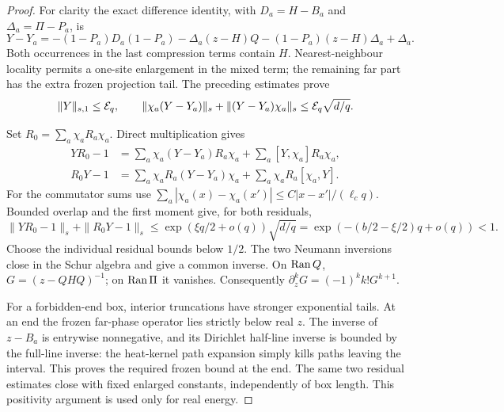 \begin{proof}
For clarity the exact difference identity, with
$D_a=H-B_a$ and $\Delta_a=\Pi-P_a$, is
\begin{equation}\label{eq:belowmismatch}
 Y-Y_a=-(1-P_a)D_a(1-P_a)
 -\Delta_a(z-H)Q-(1-P_a)(z-H)\Delta_a+\Delta_a.
\end{equation}
Both occurrences in the last compression terms contain $H$.
Nearest-neighbour locality permits a one-site enlargement in the mixed term; the remaining far part has the extra frozen projection tail. The preceding estimates prove
\[
 \|Y\|_{s,1}\le\mathcal E_q,\qquad
 \|\chi_a(Y-Y_a)\|_s+\|(Y-Y_a)\chi_a\|_s\le\mathcal E_q\sqrt{d/q}.
\]

Set $R_0=\sum_a\chi_aR_a\chi_a$. Direct multiplication gives
\[
\begin{split}
 YR_0-1&=\sum_a\chi_a(Y-Y_a)R_a\chi_a
                  +\sum_a[Y,\chi_a]R_a\chi_a,\\
 R_0Y-1&=\sum_a\chi_aR_a(Y-Y_a)\chi_a
                  +\sum_a\chi_aR_a[\chi_a,Y].
\end{split}
\]
For the commutator sums use
$\sum_a|\chi_a(x)-\chi_a(x')|\le C|x-x'|/(\ell_cq)$.
Bounded overlap and the first moment give, for both residuals,
\[
 \|YR_0-1\|_s+\|R_0Y-1\|_s
 \le\exp(\xi q/2+o(q))\sqrt{d/q}
 =\exp(-(b/2-\xi/2)q+o(q))<1.
\]
Choose the individual residual bounds below $1/2$. The two Neumann inversions close in the Schur algebra and give a common inverse. On $\operatorname{Ran} Q$, $G=(z-QHQ)^{-1}$; on $\operatorname{Ran}\Pi$ it vanishes. Consequently
$\partial_z^kG=(-1)^kk!G^{k+1}$.

For a forbidden-end box, interior truncations have stronger exponential tails. At an end the frozen far-phase operator lies strictly below real $z$. The inverse of $z-B_a$ is entrywise nonnegative, and its Dirichlet half-line inverse is bounded by the full-line inverse: the heat-kernel path expansion simply kills paths leaving the interval. This proves the required frozen bound at the end. The same two residual estimates close with fixed enlarged constants, independently of box length. This positivity argument is used only for real energy.
\end{proof}

